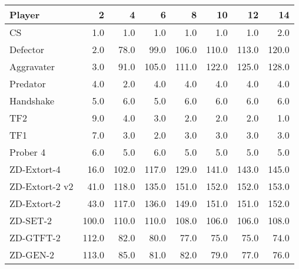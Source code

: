 \begin{tabular}{lrrrrrrr}
\toprule
         Player &      2 &      4 &      6 &      8 &     10 &     12 &     14 \\
\midrule
             CS &    1.0 &    1.0 &    1.0 &    1.0 &    1.0 &    1.0 &    2.0 \\
       Defector &    2.0 &   78.0 &   99.0 &  106.0 &  110.0 &  113.0 &  120.0 \\
     Aggravater &    3.0 &   91.0 &  105.0 &  111.0 &  122.0 &  125.0 &  128.0 \\
       Predator &    4.0 &    2.0 &    4.0 &    4.0 &    4.0 &    4.0 &    4.0 \\
      Handshake &    5.0 &    6.0 &    5.0 &    6.0 &    6.0 &    6.0 &    6.0 \\
            TF2 &    9.0 &    4.0 &    3.0 &    2.0 &    2.0 &    2.0 &    1.0 \\
            TF1 &    7.0 &    3.0 &    2.0 &    3.0 &    3.0 &    3.0 &    3.0 \\
       Prober 4 &    6.0 &    5.0 &    6.0 &    5.0 &    5.0 &    5.0 &    5.0 \\
    ZD-Extort-4 &   16.0 &  102.0 &  117.0 &  129.0 &  141.0 &  143.0 &  145.0 \\
 ZD-Extort-2 v2 &   41.0 &  118.0 &  135.0 &  151.0 &  152.0 &  152.0 &  153.0 \\
    ZD-Extort-2 &   43.0 &  117.0 &  136.0 &  149.0 &  151.0 &  151.0 &  152.0 \\
       ZD-SET-2 &  100.0 &  110.0 &  110.0 &  108.0 &  106.0 &  106.0 &  108.0 \\
      ZD-GTFT-2 &  112.0 &   82.0 &   80.0 &   77.0 &   75.0 &   75.0 &   74.0 \\
       ZD-GEN-2 &  113.0 &   85.0 &   81.0 &   82.0 &   79.0 &   77.0 &   76.0 \\
\bottomrule
\end{tabular}
